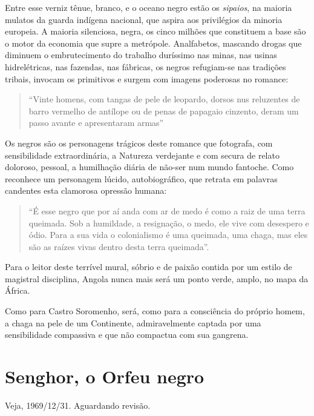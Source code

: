 \documentclass[
  letterpaper,
  DIV=11,
  numbers=noendperiod]{scrreprt}
\begin{document}
Entre esse verniz tênue, branco, e o oceano negro estão os
\emph{sipaios}, na maioria mulatos da guarda indígena nacional, que
aspira aos privilégios da minoria europeia. A maioria silenciosa, negra,
os cinco milhões que constituem a base são o motor da economia que supre
a metrópole. Analfabetos, mascando drogas que diminuem o embrutecimento
do trabalho duríssimo nas minas, nas usinas hidrelétricas, nas fazendas,
nas fábricas, os negros refugiam-se nas tradições tribais, invocam os
primitivos e surgem com imagens poderosas no romance:

\begin{quote}
``Vinte homens, com tangas de pele de leopardo, dorsos nus reluzentes de
barro vermelho de antílope ou de penas de papagaio cinzento, deram um
passo avante e apresentaram armas''
\end{quote}

Os negros são os personagens trágicos deste romance que fotografa, com
sensibilidade extraordinária, a Natureza verdejante e com secura de
relato doloroso, pessoal, a humilhação diária de não-ser num mundo
fantoche. Como reconhece um personagem lúcido, autobiográfico, que
retrata em palavras candentes esta clamorosa opressão humana:

\begin{quote}
``É esse negro que por aí anda com ar de medo é como a raiz de uma terra
queimada. Sob a humildade, a resignação, o medo, ele vive com desespero
e ódio. Para a sua vida o colonialismo é uma queimada, uma chaga, mas
eles são as raízes vivas dentro desta terra queimada''.
\end{quote}

Para o leitor deste terrível mural, sóbrio e de paixão contida por um
estilo de magistral disciplina, Angola nunca mais será um ponto verde,
amplo, no mapa da África.

Como para Castro Soromenho, será, como para a consciência do próprio
homem, a chaga na pele de um Continente, admiravelmente captada por uma
sensibilidade compassiva e que não compactua com sua gangrena.

\chapter{Senghor, o Orfeu negro}\label{senghor-o-orfeu-negro}

Veja, 1969/12/31. Aguardando revisão.

\hfill\break
\end{document}
